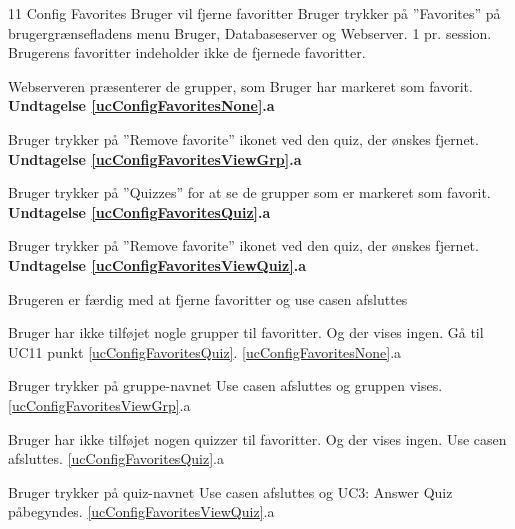 
\uchead
	{11}
	{Config Favorites}
	{Bruger vil fjerne favoritter}
	{Bruger trykker på ''Favorites'' på brugergrænsefladens menu}
	{Bruger, Databaseserver og Webserver.}
	{}
	{1 pr. session.}
	{Brugerens favoritter indeholder ikke de fjernede favoritter.}

\item \label{ucConfigFavoritesNone} Webserveren præsenterer de  grupper, som Bruger har markeret som favorit.
\textbf{Undtagelse \ref{ucConfigFavoritesNone}.a}

\item \label{ucConfigFavoritesViewGrp}Bruger trykker på ''Remove favorite'' ikonet ved den quiz, der ønskes fjernet.
\textbf{Undtagelse \ref{ucConfigFavoritesViewGrp}.a}

\item \label{ucConfigFavoritesQuiz}Bruger trykker på ''Quizzes'' for at se de grupper som er markeret som favorit.
\textbf{Undtagelse \ref{ucConfigFavoritesQuiz}.a}

\item \label{ucConfigFavoritesViewQuiz}Bruger trykker på ''Remove favorite'' ikonet ved den quiz, der ønskes fjernet.
\textbf{Undtagelse \ref{ucConfigFavoritesViewQuiz}.a}

\item Brugeren er færdig med at fjerne favoritter og use casen afsluttes

\ucdescriptionend

\ucextension
	{Bruger har ikke tilføjet nogle grupper til favoritter. Og der vises ingen.}
	{Gå til UC11 punkt \ref{ucConfigFavoritesQuiz}.}
	{\ref{ucConfigFavoritesNone}.a}
		
\ucextension
	{Bruger trykker på gruppe-navnet}
	{Use casen afsluttes og gruppen vises.}
	{\ref{ucConfigFavoritesViewGrp}.a}		
		
\ucextension
			{Bruger har ikke tilføjet nogen quizzer til favoritter. Og der vises ingen.}
	{Use casen afsluttes.}
	{\ref{ucConfigFavoritesQuiz}.a}
	
\ucextension
	{Bruger trykker på quiz-navnet}
	{Use casen afsluttes og UC3: Answer Quiz påbegyndes.}
	{\ref{ucConfigFavoritesViewQuiz}.a}
		
